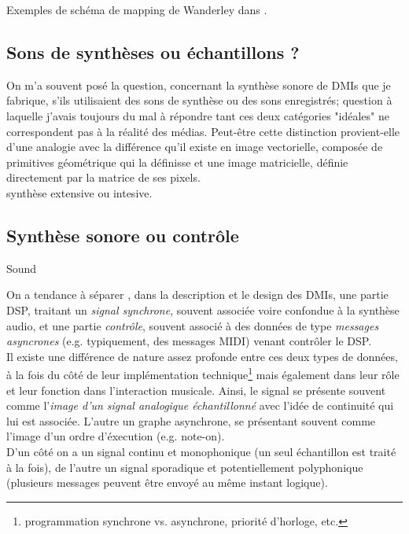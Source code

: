 Exemples de schéma de mapping de Wanderley dans \cite{wanderley_escher-modeling_1998}.

\subsection{Sons de synthèses ou échantillons ?}

On m'a souvent posé la question, concernant la synthèse sonore de DMIs que je fabrique, s'ils utilisaient des sons de synthèse ou des sons enregistrés; question à laquelle j'avais toujours du mal à répondre tant ces deux catégories "idéales" ne correspondent pas à la réalité des médias. 
Peut-être cette distinction provient-elle d'une analogie avec la différence qu'il existe en image vectorielle, composée de primitives géométrique qui la définisse et une image matricielle, définie directement par la matrice de ses pixels.\\
synthèse extensive ou intesive.


\subsection{Synthèse sonore ou contrôle}

Sound  \cite{di_scipio_sound_2003}

On a tendance à séparer , dans la description et le design des \glspl{DMI}, une partie \gls{DSP}, traitant un \textit{signal synchrone}, souvent associée voire confondue à la synthèse audio, et une partie \textit{contrôle}, souvent associé à des données de type \textit{messages asyncrones} (e.g. typiquement, des messages \gls{MIDI}) venant contrôler le \gls{DSP}.\\
Il existe une différence de nature assez profonde entre ces deux types de données, à la fois du côté de leur implémentation technique\footnote{programmation synchrone vs. asynchrone, priorité d'horloge, etc.} mais également dans leur rôle et leur fonction dans l'interaction musicale. 
Ainsi, le signal se présente souvent comme l'\textit{image d'un signal analogique échantillonné} avec l'idée de continuité qui lui est associée. L'autre un graphe asynchrone, se présentant souvent comme l'image d'un ordre d'éxecution (e.g. note-on). \\
D'un côté on a un signal continu et monophonique (un seul échantillon est traité à la fois), de l'autre un signal sporadique et potentiellement polyphonique (plusieurs messages peuvent être envoyé au même instant logique).\\

